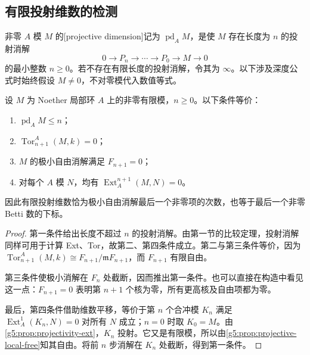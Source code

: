 \subsection{有限投射维数的检测}
\label{g5:subsec:0804:03}

\begin{definition}\label{g5:def:projective-dimension}
	非零 \(A\) 模 \(M\) 的[projective dimension]记为 \(\operatorname{pd}_A M\)，是使 \(M\) 存在长度为 \(n\) 的投射消解
	\[
		0\longrightarrow P_n\longrightarrow\cdots
		\longrightarrow P_0\longrightarrow M\longrightarrow0
	\]
	的最小整数 \(n\geq0\)。若不存在有限长度的投射消解，令其为 \(\infty\)。以下涉及深度公式时始终假设 \(M\ne0\)，不对零模代入数值等式。
\end{definition}

\begin{theorem}\label{g5:thm:projective-dimension-detection}
	设 \(M\) 为 Noether 局部环 \(A\) 上的非零有限模，\(n\geq0\)。以下条件等价：
	\begin{enumerate}
		\item \(\operatorname{pd}_A M\leq n\)；
		\item \(\operatorname{Tor}_{n+1}^A(M,k)=0\)；
		\item \(M\) 的极小自由消解满足 \(F_{n+1}=0\)；
		\item 对每个 \(A\) 模 \(N\)，均有 \(\operatorname{Ext}_A^{n+1}(M,N)=0\)。
	\end{enumerate}
	因此有限投射维数恰为极小自由消解最后一个非零项的次数，也等于最后一个非零 Betti 数的下标。
\end{theorem}
\begin{proof}
	第一条件给出长度不超过 \(n\) 的投射消解。由第一节的比较定理，投射消解同样可用于计算 Ext、Tor，故第二、第四条件成立。第二与第三条件等价，因为
	\(\operatorname{Tor}_{n+1}^A(M,k)\cong F_{n+1}/\mathfrak mF_{n+1}\)，而 \(F_{n+1}\) 有限自由。

	第三条件使极小消解在 \(F_n\) 处截断，因而推出第一条件。也可以直接在构造中看见这一点：\(F_{n+1}=0\) 表明第 \(n+1\) 个核为零，所有更高核及自由项都为零。

	最后，第四条件借助维数平移，等价于第 \(n\) 个合冲模 \(K_n\) 满足 \(\operatorname{Ext}_A^1(K_n,N)=0\) 对所有 \(N\) 成立；\(n=0\) 时取 \(K_0=M\)。由\cref{g5:prop:projectivity-ext}，\(K_n\) 投射。它又是有限模，所以由\cref{g5:prop:projective-local-free}知其自由。将前 \(n\) 步消解在 \(K_n\) 处截断，得到第一条件。
\end{proof}

